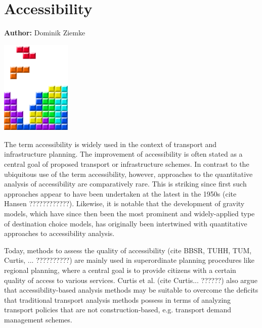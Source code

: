\chapter{Accessibility }
\label{ch:accessibility}

\hfill \textbf{Author:} Dominik Ziemke

\begin{center} \includegraphics[width=0.25\textwidth, angle=0]{figures/MATSimBook.png} \end{center}


The term accessibility is widely used in the context of transport and infrastructure planning. The improvement of accessibility is often stated as a central goal of proposed transport or infrastructure schemes. In contrast to the ubiquitous use of the term accessibility, however, approaches to the quantitative analysis of accessibility are comparatively rare. This is striking since first such approaches appear to have been undertaken at the latest in the 1950s (cite Hansen ????????????). Likewise, it is notable that the development of gravity models, which have since then been the most prominent and widely-applied type of destination choice models, has originally been intertwined with quantitative approaches to accessibility analysis.

Today, methods to assess the quality of accessibility (cite BBSR, TUHH, TUM, Curtis, ... ??????????) are mainly used in superordinate planning procedures like regional planning, where a central goal is to provide citizens with a certain quality of access to various services. Curtis et al. (cite Curtis... ??????) also argue that accessibility-based analysis methods may be suitable to overcome the deficits that traditional transport analysis methods possess in terms of analyzing transport policies that are not construction-based, e.g. transport demand management schemes.

